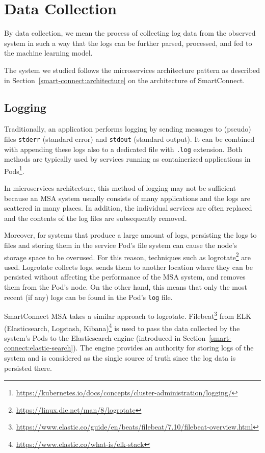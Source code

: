 \section{Data Collection}
\label{data_collection}
By data collection, we mean the process of collecting log data from the observed system in such a way that the logs can be further parsed, processed, and fed to the machine learning model.

The system we studied follows the microservices architecture pattern as described in Section~\ref{smart-connect:architecture} on the architecture of SmartConnect.\\

\subsection{Logging}

Traditionally, an application performs logging by sending messages to
(pseudo) files \texttt{stderr} (standard error) and \texttt{stdout} (standard output). It can be combined with appending these logs also to a dedicated file with \texttt{.log} extension. Both methods are typically used by services running as containerized applications in Pods\footnote{\url{https://kubernetes.io/docs/concepts/cluster-administration/logging/}}.

In microservices architecture, this method of logging may not be sufficient because an MSA system usually consists of many applications and the logs are scattered in many places. In addition, the individual services are often replaced and the contents of the log files are subsequently removed.

Moreover, for systems that produce a large amount of logs, persisting the logs to files and storing them in the service Pod's file system can cause the node's storage space to be overused. For this reason, techniques such as logrotate\footnote{\url{https://linux.die.net/man/8/logrotate}} are used. Logrotate collects logs, sends them to another location where they can be persisted without affecting the performance of the MSA system, and removes them from the Pod's node. On the other hand, this means that only the most recent (if any) logs can be found in the Pod's \texttt{log} file.

SmartConnect MSA takes a similar approach to logrotate. Filebeat\footnote{\url{https://www.elastic.co/guide/en/beats/filebeat/7.10/filebeat-overview.html}} from ELK (Elasticsearch, Logstash, Kibana)\footnote{\url{https://www.elastic.co/what-is/elk-stack}} is used to pass the data collected by the system's Pods to the Elasticsearch engine (introduced in Section~\ref{smart-connect:elastic-search}). 
The engine provides an authority for storing logs of the system and is considered as the single source of truth since the log data is persisted there.

